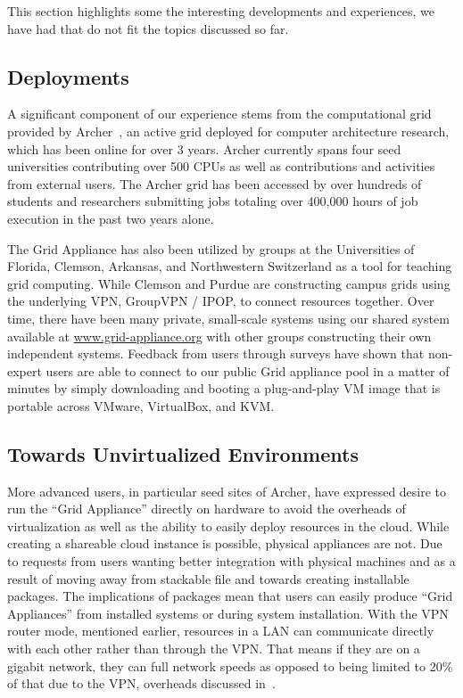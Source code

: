 \documentclass[conference]{IEEEtran}
\begin{document}
This section highlights some the interesting developments and experiences, we
have had that do not fit the topics discussed so far.  

\subsection{Deployments}

A significant component of our experience stems from the computational grid
provided by Archer~\cite{archer}, an active grid deployed for computer
architecture research, which has been online for over 3 years.  Archer
currently spans four seed universities contributing over 500 CPUs as well as
contributions and activities from external users.  The Archer grid has been
accessed by over hundreds of students and researchers submitting jobs totaling
over 400,000 hours of job execution in the past two years alone.

The Grid Appliance has also been utilized by groups at the Universities of
Florida, Clemson, Arkansas, and Northwestern Switzerland as a tool for teaching
grid computing.  While Clemson and Purdue are constructing campus grids using
the underlying VPN, GroupVPN / IPOP, to connect resources together.  Over time,
there have been many private, small-scale systems using our shared system
available at \url{www.grid-appliance.org} with other groups constructing their
own independent systems.  Feedback from users through surveys have shown that
non-expert users are able to connect to our public Grid appliance pool in a
matter of minutes by simply downloading and booting a plug-and-play VM image
that is portable across VMware, VirtualBox, and KVM.

\subsection{Towards Unvirtualized Environments}
\label{packaging}

More advanced users, in particular seed sites of Archer, have expressed desire
to run the ``Grid Appliance'' directly on hardware to avoid the overheads of
virtualization as well as the ability to easily deploy resources in the cloud.
While creating a shareable cloud instance is possible, physical appliances are
not.  Due to requests from users wanting better integration with physical
machines and as a result of moving away from stackable file and towards
creating installable packages.  The implications of packages mean that users
can easily produce ``Grid Appliances'' from installed systems or during system
installation.  With the VPN router mode, mentioned earlier, resources in a LAN
can communicate directly with each other rather than through the VPN.  That
means if they are on a gigabit network, they can full network speeds as opposed
to being limited to 20\% of that due to the VPN, overheads discussed
in~\cite{sc09}.
\end{document}
